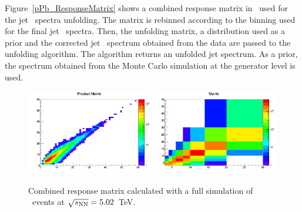 Figure~\ref{pPb_ResponseMatrix} shows a combined response matrix in \pPb\, used for the jet \pt\ spectra unfolding.
The matrix is rebinned according to the binning used for the final jet \pt\ spectra. Then, the unfolding matrix, a distribution used as a prior and the corrected jet \pt\ spectrum obtained from the data are passed to the unfolding algorithm. The algorithm returns an unfolded jet \pt spectrum. As a prior, the spectrum obtained from the Monte Carlo simulation at the generator level is used.

\begin{figure}[bth]
\centering
\includegraphics[width=0.49\textwidth]{pPbplots/ResponseMatrix/PythiaRM__Djet5Excl_2_bayes5_weight_MatrixProd}
\includegraphics[width=0.49\textwidth]{pPbplots/ResponseMatrix/PythiaRM__Djet5Excl_2_bayes5_weight_Matrix}
\caption{Combined response matrix calculated with a full simulation of \pPb\ events at $\sqrt{s_{\rm NN}}=5.02$~TeV.}
\label{fig:pPb_ResponseMatrix}
\end{figure}

